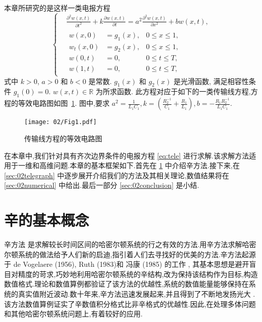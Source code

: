 本章所研究的是这样一类电报方程
\begin{equation}\label{eq:tele}
\left\lbrace
\begin{aligned}
&\frac{\partial ^2 w(x,t)}{\partial t^2}+k\frac{\partial w(x,t)}{\partial t}=a^2 \frac{\partial ^2 w(x,t)}{\partial x^2} + b w(x,t),\\
&\begin{aligned}
w(x,0)&=g_1(x),&0 \le x \le 1,\\
w_t(x,0)&=g_2(x),&0 \le x \le 1,\\
w(0,t)&=0,&0 \le t \le T,\\
w(1,t)&=0,&0 \le t \le T,
\end{aligned}
\end{aligned}
\right.
\end{equation}
式中 $k > 0$, $a>0$ 和 $b < 0$ 是常数. $g_1(x)$ 和 $g_2(x)$ 是光滑函数, 满足相容性条件 $g_1(0)=0$. $w(x,t) \in \mathbb{R}$ 为所求函数. 此方程对应于如下的一类传输线方程,方程的等效电路图如图~\ref{fig:tele1}. 图中,要求 $a^2 = \frac{1}{L_1C_1}, k= (\frac{R_2^{-1}}{C_1}+\frac{R_1}{L_1}), b =-\frac{R_1R_2^{-1}}{L_1C_1}$.
\begin{figure}[h]
    \centering
    \texttt{[image: 02/Fig1.pdf]}
    \caption{传输线方程的等效电路图}
    \label{fig:tele1}
\end{figure}

在本章中,我们针对具有齐次边界条件的电报方程 \eqref{eq:tele} 进行求解.该求解方法适用于一维和高维问题.本章的基本框架如下.首先在 \ref{sec:02symplectic} 中介绍辛方法.接下来,在 \ref{sec:02telegraph} 中逐步展开介绍我们的方法及其相关理论,数值结果将在 \ref{sec:02numerical} 中给出.最后一部分 \ref{sec:02conclusion} 是小结.

\section{辛的基本概念}\label{sec:02symplectic}
辛方法 \cite{feng2010symplectic} 是求解较长时间区间的哈密尔顿系统的行之有效的方法.用辛方法求解哈密尔顿系统的做法给予人们新的启迪,指引着人们去寻找好的优美的方法.辛方法起源于 de Vogelaere (1956), Ruth (1983)和 冯康 (1985) 的工作 \cite{hairer2006geometric}, 其基本思想是避开盲目对精度的苛求,巧妙地利用哈密尔顿系统的辛结构,改为保持该结构作为目标,构造数值格式.理论和数值算例都验证了该方法的优越性,系统的数值能量能够保持在系统的真实值附近波动.数十年来,辛方法迅速发展起来,并且得到了不断地发扬光大 \cite{calvo1994numerical,leimkuhler2004simulating,hong2006multi,yang2009extended,monovasilis2013exponentially,xin2016birkhoffian,michalas2016numerical,liao2016multi}. 该方法数值算例证实了辛数值积分格式比非辛格式的优越性.因此,在处理多体问题和其他哈密尔顿系统问题上,有着较好的应用.

